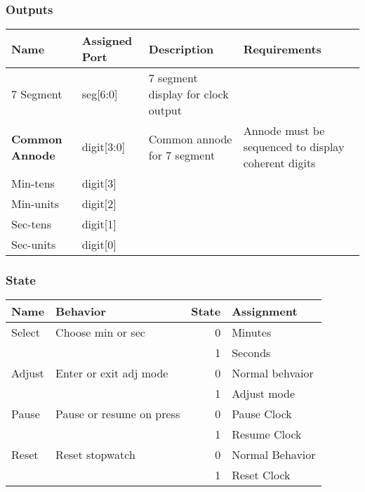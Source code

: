 \documentclass[11pt]{article}
\begin{document}
\subsubsection{Outputs}
\label{sec:org68f20c2}

\begin{center}
\begin{tabular}{llll}
Name & Assigned Port & Description & Requirements\\
\hline
7 Segment & seg[6:0] & 7 segment display for clock output & \\
\hline
\textbf{Common Annode} & digit[3:0] & Common annode for 7 segment & Annode must be sequenced to display coherent digits\\
Min-tens & digit[3] &  & \\
Min-units & digit[2] &  & \\
Sec-tens & digit[1] &  & \\
Sec-units & digit[0] &  & \\
\hline
\end{tabular}
\end{center}


\subsubsection{State}
\label{sec:orga05e167}
\begin{center}
\begin{tabular}{llrl}
Name & Behavior & State & Assignment\\
\hline
Select & Choose min or sec & 0 & Minutes\\
 &  & 1 & Seconds\\
\hline
Adjust & Enter or exit adj mode & 0 & Normal behvaior\\
 &  & 1 & Adjust mode\\
\hline
Pause & Pause or resume on press & 0 & Pause Clock\\
 &  & 1 & Resume Clock\\
\hline
Reset & Reset stopwatch & 0 & Normal Behavior\\
 &  & 1 & Reset Clock\\
\hline
\end{tabular}
\end{center}
\end{document}
